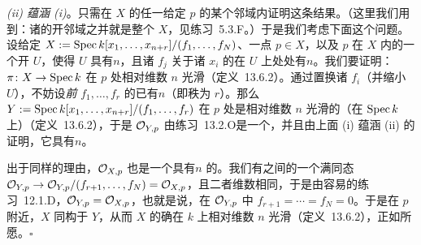 \emph{(ii) 蕴涵 (i)}。只需在 $X$ 的任一给定\trClosedPoint{} $p$ 的某个邻域内证明这条结果。（这里我们用到：诸\trClosedPoint{}的开邻域之并就是整个 $X$，见\mbox{练习~5.3.F}。）于是我们考虑下面这个问题。设给定 $X:=\operatorname{Spec} k[x_1,\dots,x_{n+r}]/(f_1,\dots,f_N)$、一点 $p\in X$，以及 $p$ 在 $X$ 内的一个开\trNeighborhood{} $U$，使得 $U$ 具有\trPureDimension $n$，且诸 $f_j$ 关于诸 $x_i$ 的\trJacobianMatrix{}在 $U$ 上处处有\trCorank $n$。我们要证明：\trStructureMorphism $\pi\colon X\to\operatorname{Spec} k$ 在 $p$ 处相对维数 $n$ 光滑（定义~13.6.2）。通过置换诸 $f_i$（并缩小 $U$），不妨设\emph{前} $f_1,\dots,f_r$ 的\trJacobianMatrix{}已有\trCorank $n$（即秩为 $r$）。那么 $Y:=\operatorname{Spec} k[x_1,\dots,x_{n+r}]/(f_1,\dots,f_r)$ 在 $p$ 处是相对维数 $n$ 光滑的（在 $\operatorname{Spec} k$ 上）（定义~13.6.2），于是\trLocalRing{} $\mathcal{O}_{Y,p}$ 由\mbox{练习~13.2.O}是一个\trIntegralDomain，并且由上面 (i) 蕴涵 (ii) 的证明，它具有\trPureDimension $n$。

出于同样的理由，$\mathcal{O}_{X,p}$ 也是一个具有\trPureDimension $n$ 的\trIntegralDomain。我们有\trIntegralDomain{}之间的一个满同态 $\mathcal{O}_{Y,p}\to\mathcal{O}_{Y,p}/(f_{r+1},\dots,f_N)=\mathcal{O}_{X,p}$，且二者维数相同，于是由\mbox{容易的练习~12.1.D}，$\mathcal{O}_{Y,p}=\mathcal{O}_{X,p}$，也就是说，在 $\mathcal{O}_{Y,p}$ 中 $f_{r+1}=\cdots=f_N=0$。于是在 $p$ 附近，$X$ 同构于 $Y$，从而 $X$ 的确在 $k$ 上相对维数 $n$ 光滑（定义~13.6.2），正如所愿。\hfill$\square$
